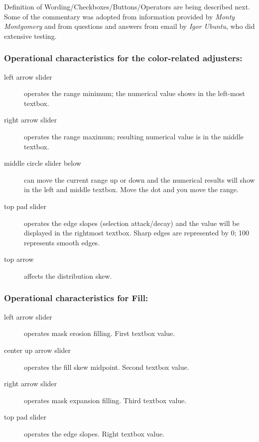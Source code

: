 Definition of Wording/Checkboxes/Buttons/Operators are being described next. Some of the commentary was adopted from information provided by \textit{Monty Montgomery} and from questions and answers from email by \textit{Igor Ubuntu}, who did extensive testing.

\subsubsection*{Operational characteristics for the \textbf{color-related adjusters}:}
\label{ssub:operational_characteristic_color}

\begin{description}
        \item[left arrow slider] operates the range minimum; the numerical value shows in the left-most textbox.
        \item[right arrow slider] operates the range maximum; resulting numerical value is in the middle textbox.
        \item[middle circle slider below] can move the current range up or down and the numerical results will show in the left and middle textbox. Move the dot and you move the range.
        \item[top pad slider] operates the edge slopes (selection attack/decay) and the value will be displayed in the
        rightmost textbox. Sharp edges are represented by 0; 100 represents smooth edges.
        \item[top arrow] affects the distribution skew.
\end{description}

\subsubsection*{Operational characteristics for \textbf{Fill}:}
\label{ssub:operational_characteristic_fill}

\begin{description}
        \item[left arrow slider] operates mask erosion filling. First textbox value.
        \item[center up arrow slider] operates the fill skew midpoint. Second textbox value.
        \item[right arrow slider] operates mask expansion filling. Third textbox value.
        \item[top pad slider] operates the edge slopes. Right textbox value.
\end{description}


